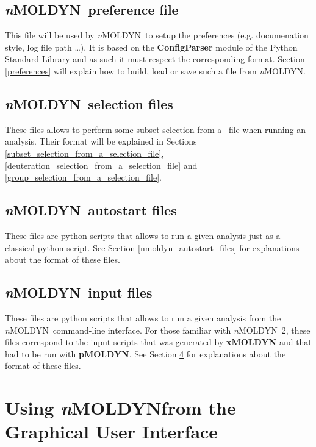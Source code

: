 \documentclass[a4paper,11pt]{report}
\newcommand{\NMOLDYN}{\textit{n}MOLDYN}
\begin{document}
\section{\NMOLDYN\ preference file}
\label{nmoldyn_preferences_file}
This file will be used by \NMOLDYN\ to setup the preferences (e.g. documenation style, log file path \ldots ). 
It is based on the \textbf{ConfigParser} module of the Python Standard Library \cite{ConfigParser} and as such it must respect the corresponding format.
Section \ref{preferences} will explain how to build, load or save such a file from \NMOLDYN.

\section{\NMOLDYN\ selection files}
\label{nmoldyn_selection_files}
These files allows to perform some subset selection from a \PDB\ file when running an analysis. Their format will 
be explained in Sections \ref{subset_selection_from_a_selection_file}, 
\ref{deuteration_selection_from_a_selection_file} and \ref{group_selection_from_a_selection_file}.

\section{\NMOLDYN\ autostart files}
\label{nmoldyn_autostart_file}
These files are python scripts that allows to run a given analysis just as a classical python script. 
See Section \ref{nmoldyn_autostart_files} for explanations about the format of these files.

\section{\NMOLDYN\ input files}
\label{nmoldyn_input_files}
These files are python scripts that allows to run a given analysis from the \NMOLDYN\ command-line interface. For those 
familiar with \NMOLDYN\ 2, these files correspond to the input scripts that was generated by \textbf{xMOLDYN} and that 
had to be run with \textbf{pMOLDYN}. See Section \ref{nmoldyn_input_files} for explanations about the format of these files.

\chapter{Using \NMOLDYN from the Graphical User Interface}
\label{running_nmoldyn_from_the_graphical_user_interface}
\end{document}
